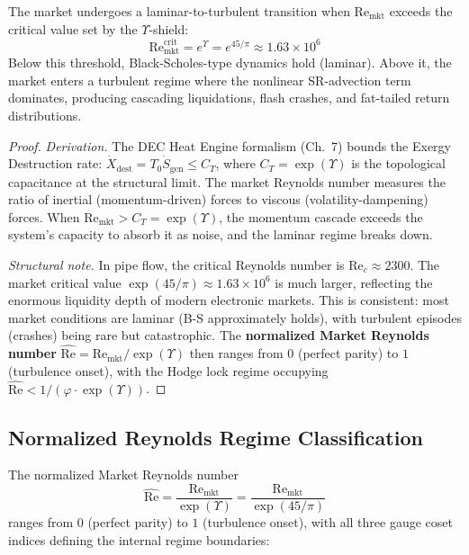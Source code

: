 \begin{theorem}\label{thm:turbulence}
The market undergoes a laminar-to-turbulent transition when $\mathrm{Re}_{\mathrm{mkt}}$ exceeds the critical value set by the $\Upsilon$-shield:
\begin{equation}
    \mathrm{Re}_{\mathrm{mkt}}^{\mathrm{crit}} = e^{\Upsilon} = e^{45/\pi} \approx 1.63 \times 10^6
\end{equation}
Below this threshold, Black-Scholes-type dynamics hold (laminar). Above it, the market enters a turbulent regime where the nonlinear SR-advection term dominates, producing cascading liquidations, flash crashes, and fat-tailed return distributions.

\begin{proof}
\emph{Derivation.} The DEC Heat Engine formalism (Ch.~7) bounds the Exergy Destruction rate: $\dot{X}_{\mathrm{dest}} = T_0\dot{S}_{\mathrm{gen}} \leq C_T$, where $C_T = \exp(\Upsilon)$ is the topological capacitance at the structural limit. The market Reynolds number measures the ratio of inertial (momentum-driven) forces to viscous (volatility-dampening) forces. When $\mathrm{Re}_{\mathrm{mkt}} > C_T = \exp(\Upsilon)$, the momentum cascade exceeds the system's capacity to absorb it as noise, and the laminar regime breaks down.

\emph{Structural note.} In pipe flow, the critical Reynolds number is $\mathrm{Re}_c \approx 2300$. The market critical value $\exp(45/\pi) \approx 1.63 \times 10^6$ is much larger, reflecting the enormous liquidity depth of modern electronic markets. This is consistent: most market conditions are laminar (B-S approximately holds), with turbulent episodes (crashes) being rare but catastrophic. The \textbf{normalized Market Reynolds number} $\hat{\mathrm{Re}} = \mathrm{Re}_{\mathrm{mkt}} / \exp(\Upsilon)$ then ranges from $0$ (perfect parity) to $1$ (turbulence onset), with the Hodge lock regime occupying $\hat{\mathrm{Re}} < 1/(\varphi \cdot \exp(\Upsilon))$.
\qedhere
\end{proof}
\end{theorem}

\subsection{Normalized Reynolds Regime Classification}

The normalized Market Reynolds number
\begin{equation}\label{eq:Re_hat}
    \hat{\mathrm{Re}} = \frac{\mathrm{Re}_{\mathrm{mkt}}}{\exp(\Upsilon)} = \frac{\mathrm{Re}_{\mathrm{mkt}}}{\exp(45/\pi)}
\end{equation}
ranges from $0$ (perfect parity) to $1$ (turbulence onset), with all three gauge coset indices defining the internal regime boundaries:

